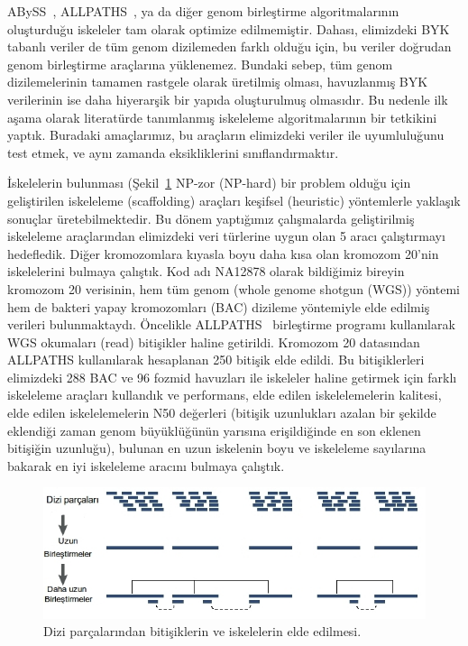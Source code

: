 \documentclass[11pt]{article}
\begin{document}
ABySS~\cite{Simpson2009}, ALLPATHS~\cite{Simpson2009}, ya da diğer genom birleştirme algoritmalarının oluşturduğu iskeleler tam olarak optimize edilmemiştir. Dahası, elimizdeki BYK tabanlı veriler de tüm genom dizilemeden farklı olduğu için, bu veriler doğrudan genom birleştirme araçlarına yüklenemez. Bundaki sebep, tüm genom dizilemelerinin tamamen rastgele olarak üretilmiş olması, havuzlanmış BYK verilerinin ise daha hiyerarşik bir yapıda oluşturulmuş olmasıdır. Bu nedenle ilk aşama olarak literatürde tanımlanmış iskeleleme algoritmalarının bir tetkikini yaptık. Buradaki amaçlarımız, bu araçların elimizdeki veriler ile uyumluluğunu test etmek, ve aynı zamanda eksikliklerini sınıflandırmaktır.

İskelelerin bulunması (Şekil~\ref{fig:scaffold} NP-zor (NP-hard) bir problem olduğu için geliştirilen iskeleleme (scaffolding) araçları keşifsel (heuristic) yöntemlerle yaklaşık sonuçlar üretebilmektedir. Bu dönem yaptığımız çalışmalarda geliştirilmiş iskeleleme araçlarından elimizdeki veri türlerine uygun olan 5 aracı çalıştırmayı hedefledik. Diğer kromozomlara kıyasla boyu daha kısa olan kromozom 20'nin iskelelerini bulmaya çalıştık. Kod adı NA12878 olarak bildiğimiz bireyin kromozom 20 verisinin, hem tüm genom (whole genome shotgun (WGS)) yöntemi hem de bakteri yapay kromozomları (BAC) dizileme yöntemiyle elde edilmiş verileri bulunmaktaydı. Öncelikle ALLPATHS~\cite{Gnerre2011} birleştirme programı kullanılarak WGS okumaları (read) bitişikler haline getirildi. Kromozom 20 datasından ALLPATHS kullanılarak hesaplanan 250 bitişik elde edildi. Bu bitişiklerleri elimizdeki 288 BAC ve 96 fozmid havuzları ile iskeleler haline getirmek için farklı iskeleleme araçları kullandık ve performans, elde edilen iskelelemelerin kalitesi, elde edilen iskelelemelerin N50 değerleri (bitişik uzunlukları azalan bir şekilde eklendiği zaman genom büyüklüğünün yarısına erişildiğinde en son eklenen bitişiğin uzunluğu), bulunan en uzun iskelenin boyu ve iskeleleme sayılarına bakarak en iyi iskeleleme aracını bulmaya çalıştık. 

\begin{figure}[htb]
\begin{center}
  \includegraphics[scale=0.75]{scaffold.png}
\end{center}
\caption{Dizi parçalarından bitişiklerin ve iskelelerin elde edilmesi.}
\label{fig:scaffold}
\end{figure}
\end{document}

